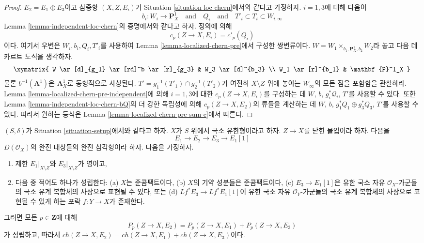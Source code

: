 \begin{proof}
\medskip\noindent
$E_2 = E_1 \oplus E_3$이고 삼중항 $(X, Z, E_i)$가 Situation
\ref{situation-loc-chern}에서와 같다고 가정하자. $i = 1, 3$에 대해
다음이
$$
b_i : W_i \to \mathbf{P}^1_X
\quad\text{and}\quad
Q_i
\quad\text{and}\quad
T'_i \subset T_i \subset W_{i, \infty}
$$
Lemma \ref{lemma-independent-loc-chern}의 증명에서와 같다고 하자.
정의에 의해
$$
c_p(Z \to X, E_i) = c'_p(Q_i)
$$
이다. 여기서 우변은 $W_i, b_i, Q_i, T'_i$를 사용하여 Lemma
\ref{lemma-localized-chern-pre}에서 구성한 쌍변류이다.
$W = W_1 \times_{b_1, \mathbf{P}^1_X, b_2} W_2$라 놓고 다음 데카르트
도식을 생각하자.
$$
\xymatrix{
W \ar[d]_{g_1} \ar[rd]^b \ar[r]_{g_3} & W_3 \ar[d]^{b_3} \\
W_1 \ar[r]^{b_1} & \mathbf{P}^1_X
}
$$
물론 $b^{-1}(\mathbf{A}^1)$은 $\mathbf{A}^1_X$로 동형적으로 사상된다.
$T' = g_1^{-1}(T'_1) \cap g_2^{-1}(T'_2)$가 여전히
$X \setminus Z$ 위에 놓이는 $W_\infty$의 모든 점을 포함함을 관찰하라.
Lemma \ref{lemma-localized-chern-pre-independent}에 의해 $i = 1, 3$에
대한 $c_p(Z \to X, E_i)$를 구성하는 데 $W$, $b$,
$g_i^*\mathcal{Q}_i$, $T'$를 사용할 수 있다. 또한 Lemma
\ref{lemma-independent-loc-chern-bQ}의 더 강한 독립성에 의해
$c_p(Z \to X, E_2)$의 류들을 계산하는 데 $W$, $b$,
$g_1^*Q_1 \oplus g_3^*Q_3$, $T'$를 사용할 수 있다.
따라서 원하는 등식은 Lemma
\ref{lemma-localized-chern-pre-sum-c}에서 따른다.
\end{proof}

\begin{lemma}
\label{lemma-additivity-loc-chern-P}
$(S, \delta)$가 Situation \ref{situation-setup}에서와 같다고 하자.
$X$가 $S$ 위에서 국소 유한형이라고 하자. $Z \to X$를
닫힌 몰입이라 하자. 다음을
$$
E_1 \to E_2 \to E_3 \to E_1[1]
$$
$D(\mathcal{O}_X)$의 완전 대상들의 완전 삼각형이라 하자.
다음을 가정하자.
\begin{enumerate}
\item 제한 $E_1|_{X \setminus Z}$와 $E_3|_{X \setminus Z}$가 영이고,
\item 다음 중 적어도 하나가 성립한다:
(a) $X$는 준콤팩트이다,
(b) $X$의 기약 성분들은 준콤팩트이다,
(c) $E_3 \to E_1[1]$은 유한 국소 자유 $\mathcal{O}_X$-가군들의
국소 유계 복합체의 사상으로 표현될 수 있다, 또는
(d) $Lf^*E_3 \to Lf^*E_1[1]$이 유한 국소 자유
$\mathcal{O}_Y$-가군들의 국소 유계 복합체의 사상으로 표현될 수
있게 하는 포락 $f : Y \to X$가 존재한다.
\end{enumerate}
그러면 모든 $p \in \mathbf{Z}$에 대해
$$
P_p(Z \to X, E_2) = P_p(Z \to X, E_1) + P_p(Z \to X, E_3)
$$
가 성립하고, 따라서
$ch(Z \to X, E_2) = ch(Z \to X, E_1) + ch(Z \to X, E_3)$이다.
\end{lemma}

